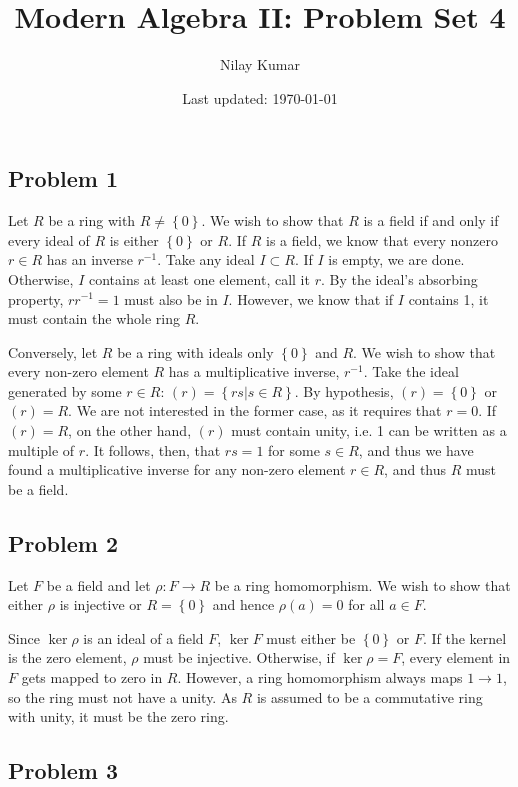 \documentclass{../../mathnotes}
\title{Modern Algebra II: Problem Set 4}
\author{Nilay Kumar}
\date{Last updated: \today}
\begin{document}
\maketitle

\subsection*{Problem 1}

Let $R$ be a ring with $R\neq\left\{ 0 \right\}$. We wish to show that $R$ is a field if and only if every ideal of $R$
is either $\left\{ 0 \right\}$ or $R$. If $R$ is a field, we know that every nonzero $r\in R$ has an inverse $r^{-1}$.
Take any ideal $I\subset R$. If $I$ is empty, we are done. Otherwise, $I$ contains at least one element, call it $r$.
By the ideal's absorbing property, $rr^{-1}=1$ must also be in $I$. However, we know that if $I$ contains 1, it must
contain the whole ring $R$.

Conversely, let $R$ be a ring with ideals only $\left\{ 0 \right\}$ and $R$. We wish to show that every non-zero element 
$R$ has a multiplicative inverse, $r^{-1}$. Take the ideal generated by some $r\in R$: $(r)=\left\{ rs | s\in R \right\}$.
By hypothesis, $(r)=\left\{ 0 \right\}$ or $(r)=R$. We are not interested in the former case, as it requires that $r=0$.
If $(r)=R$, on the other hand, $(r)$ must contain unity, i.e. 1 can be written as a multiple of $r$. It follows, then, that
$rs=1$ for some $s\in R$, and thus we have found a multiplicative inverse for any non-zero element $r\in R$, and thus $R$
must be a field.

\subsection*{Problem 2}

Let $F$ be a field and let $\rho:F\to R$ be a ring homomorphism. We wish to show that either $\rho$ is injective or
$R=\left\{ 0 \right\}$ and hence $\rho(a)=0$ for all $a\in F$.

Since $\ker\rho$ is an ideal of a field $F$,  $\ker F$ must either be $\left\{ 0 \right\}$ or $F$. If the kernel is
the zero element, $\rho$ must be injective. Otherwise, if $\ker\rho=F$, every element in $F$ gets mapped to zero in
$R$. However, a ring homomorphism always maps $1\to 1$, so the ring must not have a unity. As $R$ is assumed to be a
commutative ring with unity, it must be the zero ring.

\subsection*{Problem 3}
\end{document}
